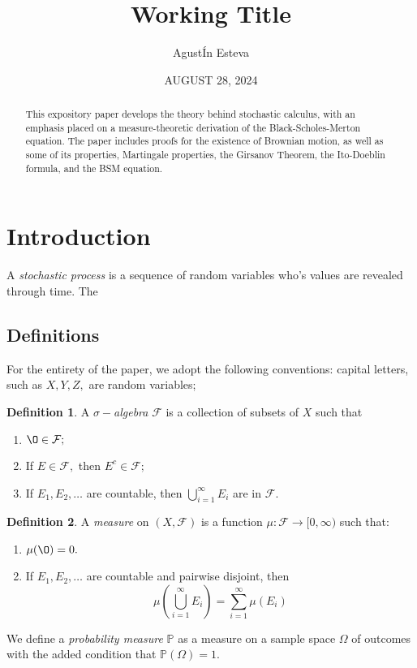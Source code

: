 \documentclass[openany, amssymb, psamsfonts]{amsart}
\title{Working Title}
\author{AgustÍn Esteva}
\date{AUGUST 28, 2024}
\theoremstyle{definition}
\newtheorem{defn}{Definition}[section]
\numberwithin{equation}{section}
\newcommand{\bbP}{\mathbb{P}}
\renewcommand{\emptyset}{\O}
\begin{document}
\begin{abstract}

This expository paper develops the theory behind stochastic calculus, with an emphasis placed on a measure-theoretic derivation of the Black-Scholes-Merton equation. 
The paper includes proofs for the existence of Brownian motion, as well as some of its properties, Martingale properties, the Girsanov Theorem, the Ito-Doeblin formula, and the BSM equation. 
\end{abstract}

\maketitle

\tableofcontents
\section{Introduction}
A \textit{stochastic process} is a sequence of random variables who's values are revealed through time. The 

\subsection{Definitions}
For the entirety of the paper, we adopt the following conventions: capital letters, such as $X,Y,Z,$ are random variables; 
\begin{defn}
A \textit{$\sigma-$algebra} $\mathcal{F}$ is a collection of subsets of $X$ such that
\begin{enumerate}
    \item $\emptyset \in \mathcal{F};$
    \item If $E \in \mathcal{F},$ then $E^c\in \mathcal{F};$
    \item If $E_1, E_2, \dots$ are countable, then $\displaystyle\bigcup_{i=1}^\infty E_i$ are in $\mathcal{F}.$
\end{enumerate}
\end{defn}

\begin{defn}
A \textit{measure} on $(X, \mathcal{F})$ is a function $\mu: \mathcal{F}\to [0,\infty)$ such that:
\begin{enumerate}
    \item $\mu(\emptyset) = 0.$
    \item If $E_1, E_2, \dots$ are countable and pairwise disjoint, then 
    \[\mu(\bigcup_{i=1}^\infty E_i) = \sum_{i=1}^\infty \mu(E_i)\]
\end{enumerate}
\end{defn}
We define a \textit{probability measure} $\bbP$ as a measure on a sample space $\Omega$ of outcomes with the added condition that $\bbP(\Omega) =1.$
\end{document}
